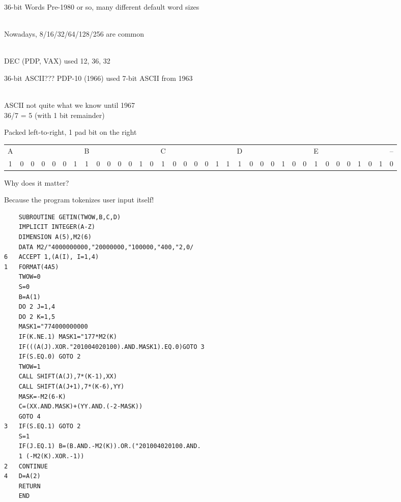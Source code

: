 \documentclass{beamer}
\def\fortran{
  \lstset{
     language=[77]FORTRAN,
     keywordstyle=\bfseries,
     extendedchars=true,
     basicstyle=\footnotesize\ttfamily,
     showstringspaces=false,
     showspaces=false,
     numbersep=9pt,
     tabsize=8,
     breaklines=true,
     showtabs=false,
     captionpos=b
  }
}
\begin{document}
\begin{frame}{36-bit Words}
Pre-1980 or so, many different default word sizes

\ \\

Nowadays, 8/16/32/64/128/256 are common

\ \\
DEC (PDP, VAX) used 12, 36, 32
\end{frame}
\begin{frame}{36-bit ASCII???}
PDP-10 (1966) used 7-bit ASCII from 1963

\ \\

ASCII not quite what we know until 1967
\ \\

36/7 = 5 (with 1 bit remainder)\ \\
\end{frame}
\begin{frame}
\begin{block}{Packed left-to-right, 1 pad bit on the right}
{\footnotesize
\setlength\tabcolsep{2.3pt}
  \begin{tabular}{|ccccccc|ccccccc|ccccccc|ccccccc|ccccccc|c}
    A & & & & & & & B & & & & & & & C & & & & & & & D & & & & & & & E & & & & & & & -- \\
    1 &
    0 &
    0 &
    0 &
    0 &
    0 &
    1 &
    1 &
    0 &
    0 &
    0 &
    0 &
    1 &
    0 &
    1 &
    0 &
    0 &
    0 &
    0 &
    1 &
    1 &
    1 &
    0 &
    0 &
    0 &
    1 &
    0 &
    0 &
    1 &
    0 &
    0 &
    0 &
    1 &
    0 &
    1 &
    0 \\
  \end{tabular}
  }
\end{block}

\end{frame}
\begin{frame}[fragile]{Why does it matter?}

{Because the program tokenizes user input itself!}

{
\fortran
\lstset{basicstyle=\tiny\ttfamily}
\begin{lstlisting}
	SUBROUTINE GETIN(TWOW,B,C,D)
	IMPLICIT INTEGER(A-Z)
	DIMENSION A(5),M2(6)
	DATA M2/"4000000000,"20000000,"100000,"400,"2,0/
6	ACCEPT 1,(A(I), I=1,4)
1	FORMAT(4A5)
	TWOW=0
	S=0
	B=A(1)
	DO 2 J=1,4
	DO 2 K=1,5
	MASK1="774000000000
	IF(K.NE.1) MASK1="177*M2(K)
	IF(((A(J).XOR."201004020100).AND.MASK1).EQ.0)GOTO 3
	IF(S.EQ.0) GOTO 2
	TWOW=1
	CALL SHIFT(A(J),7*(K-1),XX)
	CALL SHIFT(A(J+1),7*(K-6),YY)
	MASK=-M2(6-K)
	C=(XX.AND.MASK)+(YY.AND.(-2-MASK))
	GOTO 4
3	IF(S.EQ.1) GOTO 2
	S=1
	IF(J.EQ.1) B=(B.AND.-M2(K)).OR.("201004020100.AND.
	1 (-M2(K).XOR.-1))
2	CONTINUE
4	D=A(2)
	RETURN
	END
\end{lstlisting}
}

\end{frame}
\end{document}
